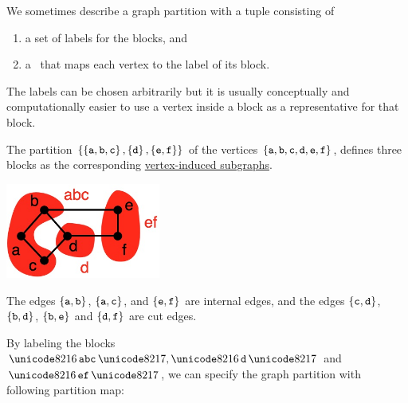 \begin{flex}
\begin{definition}
\label{def:graphcon::intro::prelim::partition-map}
We sometimes describe a graph partition with a tuple consisting of 
%
\begin{enumerate}
\item a set of labels for the blocks, and 
\item a~ that maps each vertex to the label of its
  block.
\end{enumerate}
%
The labels can be chosen arbitrarily but it is usually conceptually
and computationally easier to use a vertex inside a block as a
representative for that block.
%
\end{definition}

\begin{example}
\label{ex:graphcon::intro::prelim::partition-map}
The partition 
%
$\left\{ \left\{ \texttt{a},\texttt{b},\texttt{c} \right\},\left\{ \texttt{d} \right\},\left\{ \texttt{e},\texttt{f} \right\} \right\}$
%
of the vertices
%
$\left\{ \texttt{a},\texttt{b},\texttt{c},\texttt{d},\texttt{e},\texttt{f} \right\}$, 
%
defines three blocks as the corresponding 
%
\href{def:bg::graphs::subgraph::vi}{vertex-induced subgraphs}.

\begin{center}
  \includegraphics[width=2in]{./graph-contraction/media-introduction/contract-example3.jpg}
\end{center}
The edges $\left\{ \texttt{a},\texttt{b} \right\}$, $\left\{ \texttt{a},\texttt{c} \right\}$,
and $\left\{ \texttt{e},\texttt{f} \right\}$ are internal edges, and the edges
$\left\{ \texttt{c},\texttt{d} \right\}$, $\left\{ \texttt{b},\texttt{d} \right\}$,
$\left\{ \texttt{b},\texttt{e} \right\}$ and $\left\{ \texttt{d},\texttt{f} \right\}$ are
cut edges.

By labeling the blocks $\cstr{abc},\cstr{d}$ and
$\cstr{ef}$, we can specify the graph partition with following partition map:



\end{example}
\end{flex}
